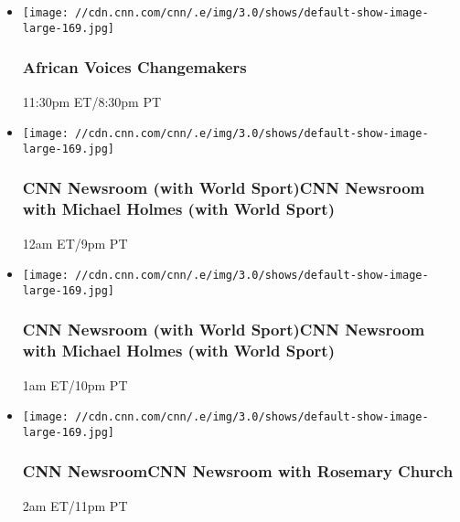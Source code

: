 \begin{itemize}
\item
  \texttt{[image: //cdn.cnn.com/cnn/.e/img/3.0/shows/default-show-image-large-169.jpg]}

  \hypertarget{african-voices-changemakers-5}{%
  \subsubsection{African Voices
  Changemakers}\label{african-voices-changemakers-5}}

  11:30pm ET/8:30pm PT
\end{itemize}

\begin{itemize}
\item
  \texttt{[image: //cdn.cnn.com/cnn/.e/img/3.0/shows/default-show-image-large-169.jpg]}

  \hypertarget{cnn-newsroom-with-world-sportcnn-newsroom-with-michael-holmes-with-world-sport-}{%
  \subsubsection{CNN Newsroom (with World Sport)CNN Newsroom with
  Michael Holmes (with World Sport)
  }\label{cnn-newsroom-with-world-sportcnn-newsroom-with-michael-holmes-with-world-sport-}}

  12am ET/9pm PT
\end{itemize}

\begin{itemize}
\item
  \texttt{[image: //cdn.cnn.com/cnn/.e/img/3.0/shows/default-show-image-large-169.jpg]}

  \hypertarget{cnn-newsroom-with-world-sportcnn-newsroom-with-michael-holmes-with-world-sport--1}{%
  \subsubsection{CNN Newsroom (with World Sport)CNN Newsroom with
  Michael Holmes (with World Sport)
  }\label{cnn-newsroom-with-world-sportcnn-newsroom-with-michael-holmes-with-world-sport--1}}

  1am ET/10pm PT
\end{itemize}

\begin{itemize}
\item
  \texttt{[image: //cdn.cnn.com/cnn/.e/img/3.0/shows/default-show-image-large-169.jpg]}

  \hypertarget{cnn-newsroomcnn-newsroom-with-rosemary-church-}{%
  \subsubsection{CNN NewsroomCNN Newsroom with Rosemary Church
  }\label{cnn-newsroomcnn-newsroom-with-rosemary-church-}}

  2am ET/11pm PT
\end{itemize}

